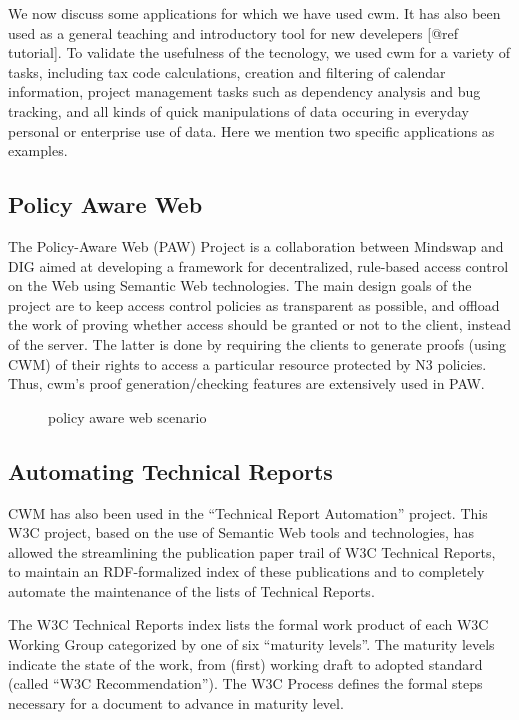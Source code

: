 \documentclass{tlp}
\begin{document}
\par We now discuss some applications for which we have used cwm. It
has also been used as a general teaching and introductory tool for
new develepers [@ref tutorial]. To validate the usefulness of the
tecnology, we used cwm for a variety of tasks, including tax code
calculations, creation and filtering of calendar information,
project management tasks such as dependency analysis and bug
tracking, and all kinds of quick manipulations of data occuring in
everyday personal or enterprise use of data. Here we mention two
specific applications as examples.
\subsection{Policy Aware Web}
  

\par The Policy-Aware Web (PAW) Project is a collaboration between
Mindswap and DIG aimed at developing a framework for decentralized,
rule-based access control on the Web using Semantic Web
technologies. The main design goals of the project are to keep
access control policies as transparent as possible, and offload the
work of proving whether access should be granted or not to the
client, instead of the server. The latter is done by requiring the
clients to generate proofs (using CWM) of their rights to access a
particular resource protected by N3 policies. Thus, cwm's proof
generation/checking features are extensively used in PAW.
\begin{figure}[tb]
\centerline{}

\caption{policy aware web scenario}\label{pawfig}

\end{figure}

\subsection{Automating Technical Reports}
  

\par CWM has also been used in the ``Technical Report Automation'' project.
This W3C project, based on the use of Semantic Web tools and
technologies, has allowed the streamlining the publication paper
trail of W3C Technical Reports, to maintain an RDF-formalized index
of these publications and to completely automate the maintenance of
the lists of Technical Reports.

\par The \empty W3C Technical Reports
index lists the formal work product of each W3C Working Group
categorized by one of six ``maturity levels''. The maturity
levels indicate the state of the work, from (first) working draft
to adopted standard (called ``W3C Recommendation''). The
\empty W3C Process
defines the formal steps necessary for a document to advance in
maturity level.
\end{document}
